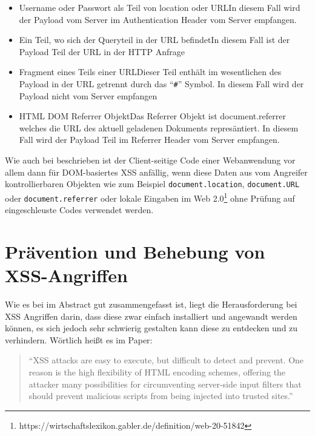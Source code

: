\begin{itemize}
	\item Username oder Passwort als Teil von location oder URL\newline In diesem Fall wird der Payload vom Server im Authentication Header vom Server empfangen.
	\item Ein Teil, wo sich der Queryteil in der URL befindet\newline In diesem Fall ist der Payload Teil der URL in der HTTP Anfrage
	\item Fragment eines Teils einer URL\newline Dieser Teil enthält im wesentlichen des Payload in der URL getrennt durch das ``\verb+#+'' Symbol. In diesem Fall wird der Payload nicht vom Server empfangen
	\item HTML DOM Referrer Objekt\newline Das Referrer Objekt ist document.referrer welches die URL des aktuell geladenen Dokuments represäntiert. In diesem Fall wird der Payload Teil im Referrer Header vom Server empfangen.
\end{itemize}

Wie auch bei \textcite{eilers2015a} beschrieben ist der Client-seitige Code einer Webanwendung vor allem dann für DOM-basiertes XSS anfällig, wenn diese Daten aus vom Angreifer kontrollierbaren Objekten wie zum Beispiel \verb+document.location+, \verb+document.URL+ oder \verb+document.referrer+ oder lokale Eingaben im Web 2.0\footnote{https://wirtschaftslexikon.gabler.de/definition/web-20-51842} ohne Prüfung auf eingeschleuste Codes verwendet werden.


\section{Prävention und Behebung von XSS-Angriffen}
\label{section:prevention_of_xss_attacks}

Wie es bei \textcite{kirda2009} im Abstract gut zusammengefasst ist, liegt die Herausforderung bei XSS Angriffen darin, dass diese zwar einfach installiert und angewandt werden können, es sich jedoch sehr schwierig gestalten kann diese zu entdecken und zu verhindern. Wörtlich heißt es im Paper:

\begin{quote}
``XSS attacks are easy to execute, but difficult to detect and prevent. One reason is the high flexibility of HTML encoding schemes, offering the attacker many possibilities for circumventing server-side input filters that should prevent malicious scripts from being injected into trusted sites.''

\autocite[592]{kirda2009}
\end{quote}

